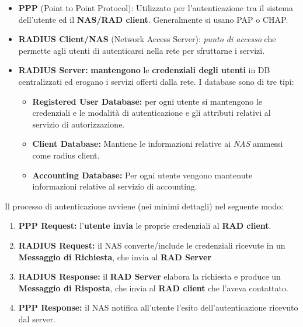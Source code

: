 \begin{definition}
\begin{itemize}
    \item \textbf{PPP} (Point to Point Protocol): Utilizzato per l'autenticazione tra il sistema dell'utente ed il \textbf{NAS/RAD client}. Generalmente si usano PAP o CHAP.
    \item \textbf{RADIUS Client/NAS} (Network Access Server): \textit{punto di accesso} che permette agli utenti di autenticarsi nella rete per sfruttarne i servizi. 
    \item \textbf{RADIUS Server:} \textbf{mantengono} le \textbf{credenziali degli utenti} in DB centralizzati ed erogano i servizi offerti dalla rete. I database sono di tre tipi:
    \begin{itemize}
        \item \textbf{Registered User Database:} per ogni utente si mantengono le credenziali e le modalità di autenticazione e gli attributi relativi al servizio di autorizzazione.
        \item \textbf{Client Database:} Mantiene le informazioni relative ai \textit{NAS} ammessi come radius client. 
        \item \textbf{Accounting Database:} Per ogni utente vengono mantenute informazioni relative al servizio di accounting.
    \end{itemize}
\end{itemize}
\end{definition}
Il processo di autenticazione avviene (nei minimi dettagli) nel seguente modo: 
\begin{proposition}
\begin{enumerate}
    \item \textbf{PPP Request:} l'\textbf{utente invia} le proprie credenziali al \textbf{RAD client}.
    \item \textbf{RADIUS Request:} il NAS converte/include le credenziali ricevute in un \textbf{Messaggio di Richiesta}, che invia al \textbf{RAD Server}
    \item \textbf{RADIUS Response:} il \textbf{RAD Server} elabora la richiesta e produce un \textbf{Messaggio di Risposta}, che invia al \textbf{RAD client} che l'aveva contattato.
    \item \textbf{PPP Response:} il NAS notifica all'utente l'esito dell'autenticazione ricevuto dal server.
\end{enumerate}
\end{proposition}
